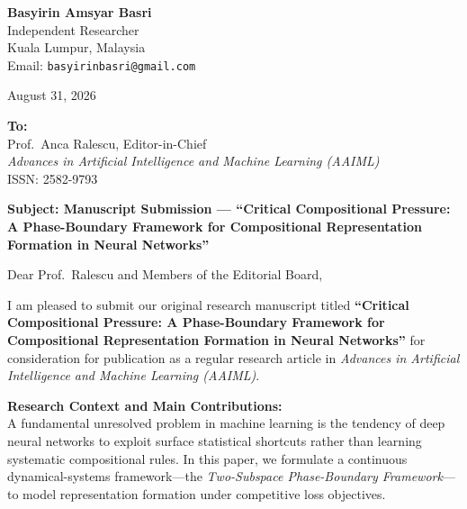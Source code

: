 \documentclass[11pt]{article}
\begin{document}
\noindent
\textbf{Basyirin Amsyar Basri} \\
Independent Researcher \\
Kuala Lumpur, Malaysia \\
Email: \texttt{basyirinbasri@gmail.com}

\vspace{1.5em}
\noindent
August 31, 2026

\vspace{1em}
\noindent
\textbf{To:} \\
Prof.\ Anca Ralescu, Editor-in-Chief \\
\emph{Advances in Artificial Intelligence and Machine Learning (AAIML)} \\
ISSN: 2582-9793

\vspace{1.5em}
\noindent
\textbf{Subject: Manuscript Submission — ``Critical Compositional Pressure: A Phase-Boundary Framework for Compositional Representation Formation in Neural Networks''}

\vspace{1em}
\noindent
Dear Prof.\ Ralescu and Members of the Editorial Board,

\vspace{0.8em}
\noindent
I am pleased to submit our original research manuscript titled \textbf{``Critical Compositional Pressure: A Phase-Boundary Framework for Compositional Representation Formation in Neural Networks''} for consideration for publication as a regular research article in \emph{Advances in Artificial Intelligence and Machine Learning (AAIML)}.

\vspace{0.8em}
\noindent
\textbf{Research Context and Main Contributions:} \\
A fundamental unresolved problem in machine learning is the tendency of deep neural networks to exploit surface statistical shortcuts rather than learning systematic compositional rules. In this paper, we formulate a continuous dynamical-systems framework---the \emph{Two-Subspace Phase-Boundary Framework}---to model representation formation under competitive loss objectives. 
\end{document}
